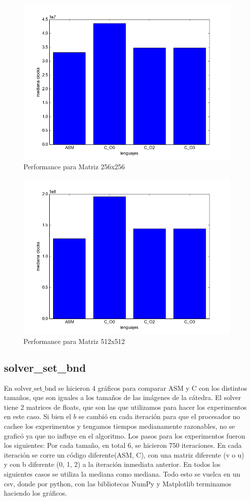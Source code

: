 \pagebreak

\begin{figure}[h]
  \centering
  	\includegraphics[width=.6\linewidth]{Matriz_256.png}
  	\caption{Performance para Matriz 256x256}
  	\label{fig:M256}
\end{figure}

\begin{figure}[h]
  \centering
  	\includegraphics[width=.6\linewidth]{Matriz_512.png}
  	\caption{Performance para Matriz 512x512}
  	\label{fig:M512}
\end{figure}

\newpage

\subsection{solver\_set\_bnd}

En solver$\_$set$\_$bnd se hicieron 4 gráficos para comparar ASM y C con los distintos tamaños, que son iguales a los tamaños de las imágenes de la cátedra. El solver tiene 2 matrices de floats, que son las que utilizamos para hacer los experimentos en este caso. Si bien el $b$ se cambió en cada iteración para que el procesador no cachee los experimentos y tengamos tiempos medianamente razonables, no se graficó ya que no influye en el algoritmo.
Los pasos para los experimentos fueron los siguientes:
Por cada tamaño, en total 6, se hicieron 750 iteraciones. En cada iteración se corre un código diferente(ASM, C), con una matriz diferente (v o u) y con b diferente (0, 1, 2) a la iteración inmediata anterior. En todos los siguientes casos se utiliza la mediana como mediana.
Todo esto se vuelca en un csv, donde por python, con las bibliotecas NumPy y Matplotlib terminamos haciendo los gráficos. 

